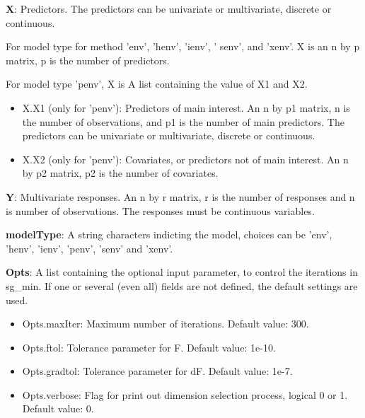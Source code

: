 \documentclass[a4paper,11pt,openany]{memoir}
\begin{document}
\begin{par}
\textbf{X}: Predictors.  The predictors can be univariate or multivariate, discrete or continuous.
\end{par} \vspace{1em}
\begin{par}
For model type for method 'env', 'henv', 'ienv', ' senv', and 'xenv'. X is an n by p matrix, p is the number of predictors.
\end{par} \vspace{1em}
\begin{par}
For model type 'penv', X is  A list containing the value of X1 and X2.
\end{par} \vspace{1em}
\begin{itemize}
\setlength{\itemsep}{-1ex}
   \item X.X1 (only for 'penv'): Predictors of main interest. An n by p1 matrix, n is the number of observations, and p1 is the number of main predictors. The predictors can be univariate or multivariate, discrete or continuous.
   \item X.X2 (only for 'penv'): Covariates, or predictors not of main interest.  An n by p2 matrix, p2 is the number of covariates.
\end{itemize}
\begin{par}
\textbf{Y}: Multivariate responses. An n by r matrix, r is the number of responses and n is number of observations. The responses must be continuous variables.
\end{par} \vspace{1em}
\begin{par}
\textbf{modelType}: A string characters indicting the model, choices can be 'env', 'henv', 'ienv', 'penv', 'senv' and 'xenv'.
\end{par} \vspace{1em}
\begin{par}
\textbf{Opts}: A list containing the optional input parameter, to control the iterations in sg\_min. If one or several (even all) fields are not defined, the default settings are used.
\end{par} \vspace{1em}
\begin{itemize}
\setlength{\itemsep}{-1ex}
   \item Opts.maxIter: Maximum number of iterations.  Default value: 300.
   \item Opts.ftol: Tolerance parameter for F.  Default value: 1e-10.
   \item Opts.gradtol: Tolerance parameter for dF.  Default value: 1e-7.
   \item Opts.verbose: Flag for print out dimension selection process, logical 0 or 1. Default value: 0.
\end{itemize}
\end{document}
